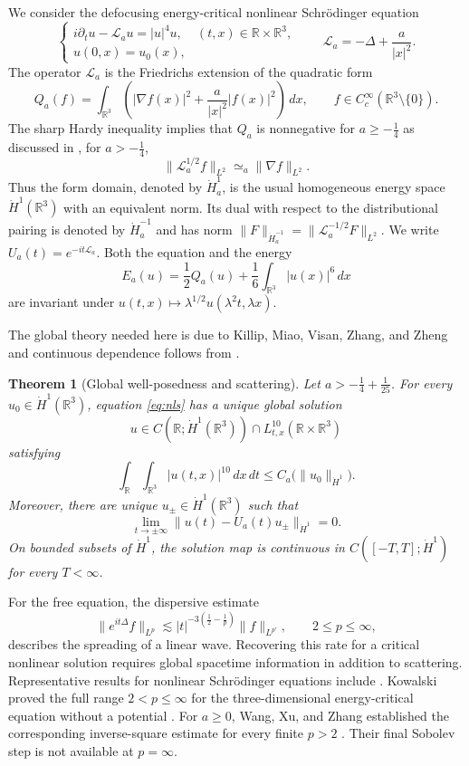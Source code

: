 \documentclass[preprint,12pt]{elsarticle}
\numberwithin{equation}{section}
\newtheorem{theorem}{Theorem}[section]
\theoremstyle{definition}
\theoremstyle{remark}
\newcommand{\R}{\mathbb R}
\newcommand{\cL}{\mathcal L}
\newcommand{\Ha}{\dot H_a^1}
\newcommand{\Ham}{\dot H_a^{-1}}
\newcommand{\norm}[2]{\lVert #1\rVert_{#2}}
\begin{document}
We consider the defocusing energy-critical nonlinear Schr\"odinger equation
\begin{equation}
 \begin{cases}
  i\partial_tu-\cL_a u=|u|^4u, & (t,x)\in\R\times\R^3,\\
  u(0,x)=u_0(x),
 \end{cases}
 \qquad \cL_a=-\Delta+\dfrac{a}{|x|^2}.
 \label{eq:nls}
\end{equation}
The operator $\cL_a$ is the Friedrichs extension of the quadratic form
\[
 Q_a(f)=\int_{\R^3}\left(|\nabla f(x)|^2+
                  \frac{a}{|x|^2}|f(x)|^2\right)\,dx,
 \qquad f\in C_c^\infty(\R^3\setminus\{0\}).
\]
The sharp Hardy inequality implies that $Q_a$ is nonnegative for
$a\geq-\frac14$ as discussed in \cite{KillipSobolev}, for $a>-\frac14$,
\[
 \norm{\cL_a^{1/2}f}{L^2}\simeq_a\norm{\nabla f}{L^2}.
\]
Thus the form domain, denoted by $\Ha$, is the usual homogeneous energy
space $\dot H^1(\R^3)$ with an equivalent norm. Its dual with respect
to the distributional pairing is denoted by $\Ham$ and has norm
$\norm{F}{\Ham}=\norm{\cL_a^{-1/2}F}{L^2}$. We write
$U_a(t)=e^{-it\cL_a}$. Both the equation and the energy
\[
 E_a(u)=\frac12 Q_a(u)+\frac16\int_{\R^3}|u(x)|^6\,dx
\]
are invariant under $u(t,x)\mapsto\lambda^{1/2}u(\lambda^2t,\lambda x)$.

The global theory needed here is due to Killip, Miao, Visan, Zhang, and
Zheng \cite[Theorem~1.2]{KillipNLS} and continuous dependence follows from
\cite[Theorem~2.11]{KillipNLS}.

\begin{theorem}[Global well-posedness and scattering]
\label{thm:global}
Let $a>-\frac14+\frac1{25}$. For every $u_0\in\dot H^1(\R^3)$,
equation \eqref{eq:nls} has a unique global solution
\[
 u\in C(\R;\dot H^1(\R^3))\cap L^{10}_{t,x}(\R\times\R^3)
\]
satisfying
\begin{equation}
 \int_{\R}\int_{\R^3}|u(t,x)|^{10}\,dx\,dt
 \leq C_a\bigl(\norm{u_0}{\dot H^1}\bigr).
 \label{eq:critical-bound}
\end{equation}
Moreover, there are unique $u_\pm\in\dot H^1(\R^3)$ such that
\[
 \lim_{t\to\pm\infty}
 \norm{u(t)-U_a(t)u_\pm}{\dot H^1}=0.
\]
On bounded subsets of $\dot H^1$, the solution map is continuous in
$C([-T,T];\dot H^1)$ for every $T<\infty$.
\end{theorem}

For the free equation, the dispersive estimate
\[
 \norm{e^{it\Delta}f}{L^p}
 \lesssim |t|^{-3(\frac12-\frac1p)}\norm{f}{L^{p'}},
 \qquad 2\leq p\leq\infty,
\]
describes the spreading of a linear wave. Recovering this rate for a
critical nonlinear solution requires global spacetime information in
addition to scattering. Representative results for nonlinear
Schr\"odinger equations include
\cite{FanZhao2021,FanZhao2023,FanStaffilaniZhao,GuoHuangSong,
FanKillipVisanZhao}. Kowalski proved the full range $2<p\leq\infty$ for
the three-dimensional energy-critical equation without a potential
\cite{Kowalski}. For $a\geq0$, Wang, Xu, and Zhang established the
corresponding inverse-square estimate for every finite $p>2$
\cite[Theorem~1.2]{WangXuZhang}. Their final Sobolev step is not
available at $p=\infty$.
\end{document}
